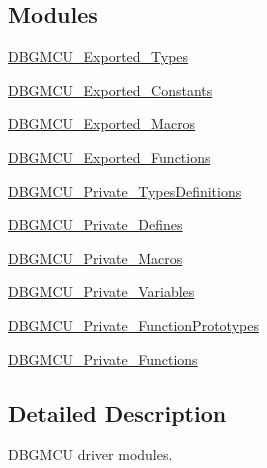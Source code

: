 \subsection*{Modules}
\begin{DoxyCompactItemize}
\item 
\hyperlink{group___d_b_g_m_c_u___exported___types}{D\+B\+G\+M\+C\+U\+\_\+\+Exported\+\_\+\+Types}
\item 
\hyperlink{group___d_b_g_m_c_u___exported___constants}{D\+B\+G\+M\+C\+U\+\_\+\+Exported\+\_\+\+Constants}
\item 
\hyperlink{group___d_b_g_m_c_u___exported___macros}{D\+B\+G\+M\+C\+U\+\_\+\+Exported\+\_\+\+Macros}
\item 
\hyperlink{group___d_b_g_m_c_u___exported___functions}{D\+B\+G\+M\+C\+U\+\_\+\+Exported\+\_\+\+Functions}
\item 
\hyperlink{group___d_b_g_m_c_u___private___types_definitions}{D\+B\+G\+M\+C\+U\+\_\+\+Private\+\_\+\+Types\+Definitions}
\item 
\hyperlink{group___d_b_g_m_c_u___private___defines}{D\+B\+G\+M\+C\+U\+\_\+\+Private\+\_\+\+Defines}
\item 
\hyperlink{group___d_b_g_m_c_u___private___macros}{D\+B\+G\+M\+C\+U\+\_\+\+Private\+\_\+\+Macros}
\item 
\hyperlink{group___d_b_g_m_c_u___private___variables}{D\+B\+G\+M\+C\+U\+\_\+\+Private\+\_\+\+Variables}
\item 
\hyperlink{group___d_b_g_m_c_u___private___function_prototypes}{D\+B\+G\+M\+C\+U\+\_\+\+Private\+\_\+\+Function\+Prototypes}
\item 
\hyperlink{group___d_b_g_m_c_u___private___functions}{D\+B\+G\+M\+C\+U\+\_\+\+Private\+\_\+\+Functions}
\end{DoxyCompactItemize}


\subsection{Detailed Description}
D\+B\+G\+M\+CU driver modules. 

